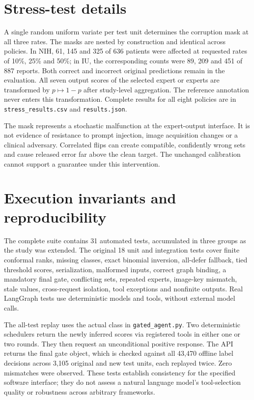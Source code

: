 \documentclass[10pt,a4paper]{article}
\begin{document}
\section{Stress-test details}
A single random uniform variate per test unit determines the corruption mask at all three rates. The masks are nested by construction and identical across policies. In NIH, 61, 145 and 325 of 636 patients were affected at requested rates of 10\%, 25\% and 50\%; in IU, the corresponding counts were 89, 209 and 451 of 887 reports. Both correct and incorrect original predictions remain in the evaluation. All seven output scores of the selected expert or experts are transformed by $p\mapsto1-p$ after study-level aggregation. The reference annotation never enters this transformation. Complete results for all eight policies are in \texttt{stress\_results.csv} and \texttt{results.json}.

The mask represents a stochastic malfunction at the expert-output interface. It is not evidence of resistance to prompt injection, image acquisition changes or a clinical adversary. Correlated flips can create compatible, confidently wrong sets and cause released error far above the clean target. The unchanged calibration cannot support a guarantee under this intervention.

\section{Execution invariants and reproducibility}
The complete suite contains 31 automated tests, accumulated in three groups as the study was extended. The original 18 unit and integration tests cover finite conformal ranks, missing classes, exact binomial inversion, all-defer fallback, tied threshold scores, serialization, malformed inputs, correct graph binding, a mandatory final gate, conflicting sets, repeated experts, image-key mismatch, stale values, cross-request isolation, tool exceptions and nonfinite outputs. Real LangGraph tests use deterministic models and tools, without external model calls.

The all-test replay uses the actual class in \texttt{gated\_agent.py}. Two deterministic schedulers return the newly inferred scores via registered tools in either one or two rounds. They then request an unconditional positive response. The API returns the final gate object, which is checked against all 43,470 offline label decisions across 3,105 original and new test units, each replayed twice. Zero mismatches were observed. These tests establish consistency for the specified software interface; they do not assess a natural language model's tool-selection quality or robustness across arbitrary frameworks.
\end{document}
